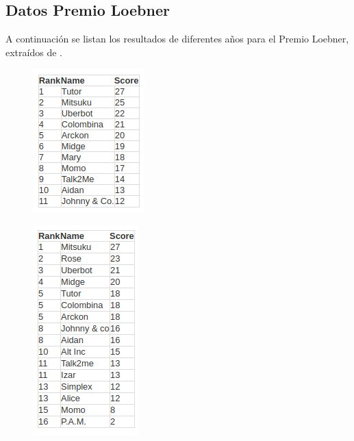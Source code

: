 \documentclass{article}
\begin{document}
\subsection{Datos Premio Loebner}
\label{sec:an1}
A continuaci\'on se listan los resultados de diferentes a\~nos para el Premio Loebner, extra\'idos de \cite{loebner1}.
\begin{figure}[h]
\centering
\begin{minipage}{.5\textwidth}
  \centering
  \includegraphics[width=.4\linewidth]{TT2018}
  \label{fig:tt2018}
\end{minipage}%
\begin{minipage}{.5\textwidth}
  \centering
  \includegraphics[width=.4\linewidth]{TT2017}
  \label{fig:tt2017}
\end{minipage}
\end{figure}
\end{document}
